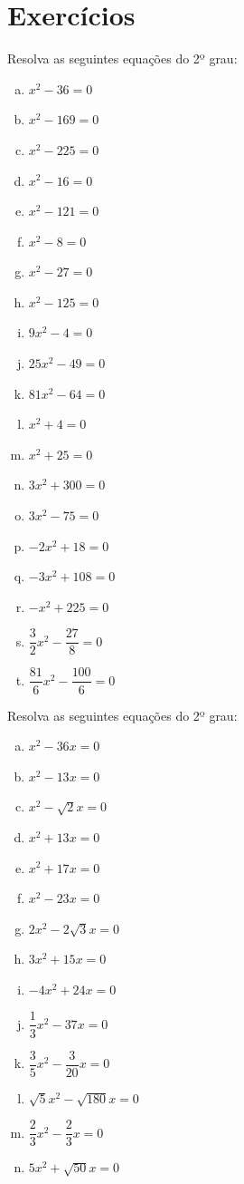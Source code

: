  \section{Exercícios}
\begin{exer}
Resolva as seguintes equações do 2º grau:

\begin{multicols}{3}
\begin{enumerate}[a)]
\item $x^2 - 36=0$
\item $x^2 - 169=0$
\item $x^2 - 225=0$
\item $x^2 - 16=0$
\item $x^2 - 121=0$
\item $x^2 - 8=0$
\item $x^2 - 27=0$
\item $x^2 - 125=0$
\item $9x^2 - 4=0$
\item $25x^2 - 49=0$
\item $81x^2 - 64=0$
\item $x^2 + 4=0$
\item $x^2 + 25=0$
\item $3x^2 + 300=0$
\item $3x^2 - 75=0$
\item $-2x^2 + 18=0$
\item $-3x^2 + 108=0$
\item $-x^2 + 225=0$
\item $\dfrac{3}{2}x^2 - \dfrac{27}{8}= 0$
\item $\dfrac{81}{6}x^2 - \dfrac{100}{6}= 0$
\end{enumerate}
\end{multicols}
\end{exer}

\begin{exer}
Resolva as seguintes equações do 2º grau:
\begin{multicols}{3}
\begin{enumerate}[a)]
\item $x^2 - 36x=0$
\item $x^2 - 13x=0$
\item $x^2 - \sqrt{2}x=0$
\item $x^2 + 13x=0$
\item $x^2 + 17x=0$
\item $x^2 - 23x=0$
\item $2x^2 - 2\sqrt{3}x= 0$
\item $3x^2 + 15x=0$
\item $-4x^2 + 24x=0$
\item $\dfrac{1}{3}x^2 - 37x=0$
\item $\dfrac{3}{5}x^2 - \dfrac{3}{20}x=0$
\item $\sqrt{5}x^2 - \sqrt{180}x=0$
\item $\dfrac{2}{3}x^2 - \dfrac{2}{3}x=0$
\item $5x^2 + \sqrt{50}x= 0$
\end{enumerate}
\end{multicols}
\end{exer}

